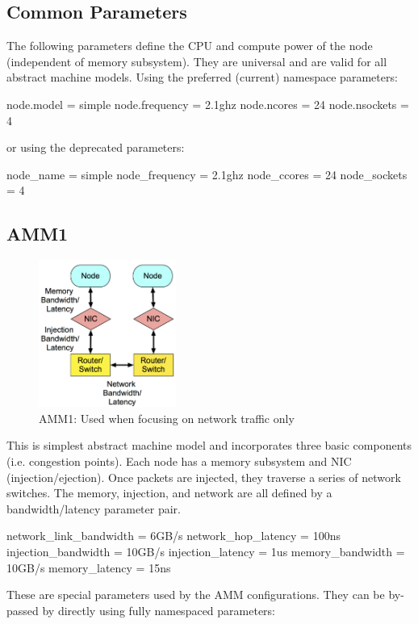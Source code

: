 \subsection{Common Parameters}
\label{subsec:commonParams}
The following parameters define the CPU and compute power of the node (independent of memory subsystem).
They are universal and are valid for all abstract machine models.  Using the preferred (current) namespace parameters:

\begin{ViFile}
node.model = simple
node.frequency = 2.1ghz
node.ncores = 24
node.nsockets = 4
\end{ViFile}
or using the deprecated parameters:

\begin{ViFile}
node_name = simple
node_frequency = 2.1ghz
node_ccores = 24
node_sockets = 4
\end{ViFile}

\subsection{AMM1}
\label{subsec:ammOne}

\begin{figure}[h!]
\begin{center}
\includegraphics[width=0.4\textwidth]{figures/amm/AMM1.png}
\end{center}
\caption{AMM1: Used when focusing on network traffic only}
\label{fig:amm1}
\end{figure}

This is simplest abstract machine model and incorporates three basic components (i.e. congestion points).
Each node has a memory subsystem and NIC (injection/ejection).
Once packets are injected, they traverse a series of network switches.
The memory, injection, and network are all defined by a bandwidth/latency parameter pair.

\begin{ViFile}
network_link_bandwidth = 6GB/s
network_hop_latency = 100ns
injection_bandwidth = 10GB/s
injection_latency = 1us
memory_bandwidth = 10GB/s
memory_latency = 15ns
\end{ViFile}
These are special parameters used by the AMM configurations.
They can be by-passed by directly using fully namespaced parameters:


